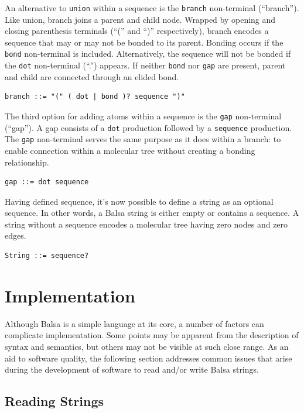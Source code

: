 \documentclass{article}
\def\ttt{\texttt}
\begin{document}
An alternative to \ttt{union} within a sequence is the \ttt{branch} non-terminal (\enquote{branch}). Like union, branch joins a parent and child node. Wrapped by opening and closing parenthesis terminals (\enquote{(} and \enquote{)} respectively), branch encodes a sequence that may or may not be bonded to its parent. Bonding occurs if the \ttt{bond} non-terminal is included. Alternatively, the sequence will not be bonded if the \ttt{dot} non-terminal (\enquote{.}) appears. If neither \ttt{bond} nor \ttt{gap} are present, parent and child are connected through an elided bond.

\begin{lstlisting}
branch ::= "(" ( dot | bond )? sequence ")"
\end{lstlisting}

The third option for adding atoms within a sequence is the \ttt{gap} non-terminal (\enquote{gap}). A gap consists of a \ttt{dot} production followed by a \ttt{sequence} production. The \ttt{gap} non-terminal serves the same purpose as it does within a branch: to enable connection within a molecular tree without creating a bonding relationship.

\begin{lstlisting}
gap ::= dot sequence
\end{lstlisting}

Having defined sequence, it's now possible to define a string as an optional sequence. In other words, a Balsa string is either empty or contains a sequence. A string without a sequence encodes a molecular tree having zero nodes and zero edges.

\begin{lstlisting}
String ::= sequence?
\end{lstlisting}

\section*{Implementation}

Although Balsa is a simple language at its core, a number of factors can complicate implementation. Some points may be apparent from the description of syntax and semantics, but others may not be visible at such close range. As an aid to software quality, the following section addresses common issues that arise during the development of software to read and/or write Balsa strings.

\subsection*{Reading Strings}
\label{reading-strings}
\end{document}
